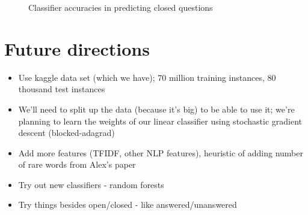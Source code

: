 \documentclass[11pt]{article}
\begin{document}
\begin{figure}
\centering
{}
\caption{Classifier accuracies in predicting closed questions}
\label{fig:results}
\end{figure}

\section{Future directions}
\begin{itemize}
\item Use kaggle data set (which we have); 70 million training instances, 80 thousand test instances
\item We’ll need to split up the data (because it’s big) to be able to use it; we’re planning to learn the weights of our linear classifier using stochastic gradient descent (blocked-adagrad)
\item Add more features (TFIDF, other NLP features), heuristic of adding number of rare words from Alex’s paper
\item Try out new classifiers - random forests
\item Try things besides open/closed - like answered/unanswered
\end{itemize}
\end{document}
